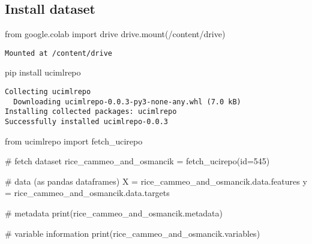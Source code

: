 \documentclass[
  letterpaper,
]{krantz}
\makeatletter
\newenvironment{Shaded}{\begin{snugshade}}{\end{snugshade}}
\newcommand{\BuiltInTok}[1]{\textcolor[rgb]{0.00,0.23,0.31}{#1}}
\newcommand{\CommentTok}[1]{\textcolor[rgb]{0.37,0.37,0.37}{#1}}
\newcommand{\DecValTok}[1]{\textcolor[rgb]{0.68,0.00,0.00}{#1}}
\newcommand{\ImportTok}[1]{\textcolor[rgb]{0.00,0.46,0.62}{#1}}
\newcommand{\NormalTok}[1]{\textcolor[rgb]{0.00,0.23,0.31}{#1}}
\newcommand{\OperatorTok}[1]{\textcolor[rgb]{0.37,0.37,0.37}{#1}}
\newcommand{\StringTok}[1]{\textcolor[rgb]{0.13,0.47,0.30}{#1}}
\newenvironment{kframe}{%
\medskip{}
\setlength{\fboxsep}{.8em}
 \def\at@end@of@kframe{}%
 \ifinner\ifhmode%
  \def\at@end@of@kframe{\end{minipage}}%
  \begin{minipage}{\columnwidth}%
 \fi\fi%
 \def\FrameCommand##1{\hskip\@totalleftmargin \hskip-\fboxsep
 \colorbox{shadecolor}{##1}\hskip-\fboxsep
     \hskip-\linewidth \hskip-\@totalleftmargin \hskip\columnwidth}%
 \MakeFramed {\advance\hsize-\width
   \@totalleftmargin\z@ \linewidth\hsize
   \@setminipage}}%
 {\par\unskip\endMakeFramed%
 \at@end@of@kframe}
\renewenvironment{Shaded}{\begin{kframe}}{\end{kframe}}
\makeatother
\begin{document}
\hypertarget{install-dataset}{%
\subsection{Install dataset}\label{install-dataset}}

\begin{Shaded}
\begin{Highlighting}[]
\ImportTok{from}\NormalTok{ google.colab }\ImportTok{import}\NormalTok{ drive}
\NormalTok{drive.mount(}\StringTok{\textquotesingle{}/content/drive\textquotesingle{}}\NormalTok{)}
\end{Highlighting}
\end{Shaded}

\begin{verbatim}
Mounted at /content/drive
\end{verbatim}

\begin{Shaded}
\begin{Highlighting}[]
\NormalTok{pip install ucimlrepo}
\end{Highlighting}
\end{Shaded}

\begin{verbatim}
Collecting ucimlrepo
  Downloading ucimlrepo-0.0.3-py3-none-any.whl (7.0 kB)
Installing collected packages: ucimlrepo
Successfully installed ucimlrepo-0.0.3
\end{verbatim}

\begin{Shaded}
\begin{Highlighting}[]
\ImportTok{from}\NormalTok{ ucimlrepo }\ImportTok{import}\NormalTok{ fetch\_ucirepo}

\CommentTok{\# fetch dataset}
\NormalTok{rice\_cammeo\_and\_osmancik }\OperatorTok{=}\NormalTok{ fetch\_ucirepo(}\BuiltInTok{id}\OperatorTok{=}\DecValTok{545}\NormalTok{)}

\CommentTok{\# data (as pandas dataframes)}
\NormalTok{X }\OperatorTok{=}\NormalTok{ rice\_cammeo\_and\_osmancik.data.features}
\NormalTok{y }\OperatorTok{=}\NormalTok{ rice\_cammeo\_and\_osmancik.data.targets}

\CommentTok{\# metadata}
\BuiltInTok{print}\NormalTok{(rice\_cammeo\_and\_osmancik.metadata)}

\CommentTok{\# variable information}
\BuiltInTok{print}\NormalTok{(rice\_cammeo\_and\_osmancik.variables)}
\end{Highlighting}
\end{Shaded}
\end{document}
